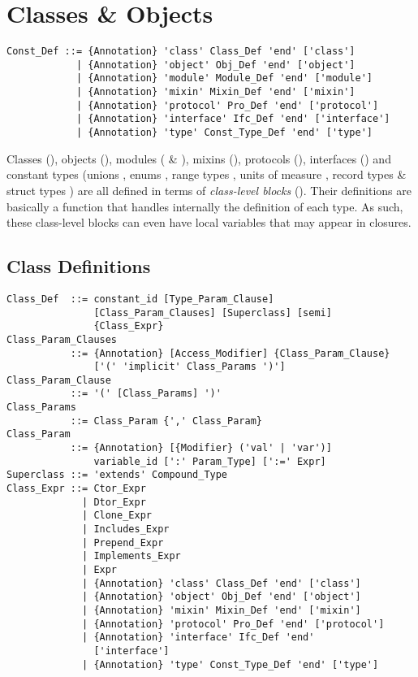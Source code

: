 
\chapter{Classes \& Objects}

\syntax\begin{lstlisting}
Const_Def ::= {Annotation} 'class' Class_Def 'end' ['class']
            | {Annotation} 'object' Obj_Def 'end' ['object']
            | {Annotation} 'module' Module_Def 'end' ['module']
            | {Annotation} 'mixin' Mixin_Def 'end' ['mixin']
            | {Annotation} 'protocol' Pro_Def 'end' ['protocol']
            | {Annotation} 'interface' Ifc_Def 'end' ['interface']
            | {Annotation} 'type' Const_Type_Def 'end' ['type']
\end{lstlisting}

Classes (), objects (), modules ( \& ), mixins (), protocols (), interfaces () and constant types (unions , enums , range types , units of measure , record types  \& struct types ) are all defined in terms of {\em class-level blocks} (). Their definitions are basically a function that handles internally the definition of each type. As such, these class-level blocks can even have local variables that may appear in closures. 

\section{Class Definitions}
\label{sec:class-definitions}

\syntax\begin{lstlisting}
Class_Def  ::= constant_id [Type_Param_Clause] 
               [Class_Param_Clauses] [Superclass] [semi]
               {Class_Expr}
Class_Param_Clauses 
           ::= {Annotation} [Access_Modifier] {Class_Param_Clause}
               ['(' 'implicit' Class_Params ')']
Class_Param_Clause
           ::= '(' [Class_Params] ')'
Class_Params 
           ::= Class_Param {',' Class_Param}
Class_Param 
           ::= {Annotation} [{Modifier} ('val' | 'var')]
               variable_id [':' Param_Type] [':=' Expr]
Superclass ::= 'extends' Compound_Type
Class_Expr ::= Ctor_Expr
             | Dtor_Expr
             | Clone_Expr
             | Includes_Expr
             | Prepend_Expr
             | Implements_Expr
             | Expr
             | {Annotation} 'class' Class_Def 'end' ['class']
             | {Annotation} 'object' Obj_Def 'end' ['object']
             | {Annotation} 'mixin' Mixin_Def 'end' ['mixin']
             | {Annotation} 'protocol' Pro_Def 'end' ['protocol']
             | {Annotation} 'interface' Ifc_Def 'end' 
               ['interface']
             | {Annotation} 'type' Const_Type_Def 'end' ['type']
\end{lstlisting}

